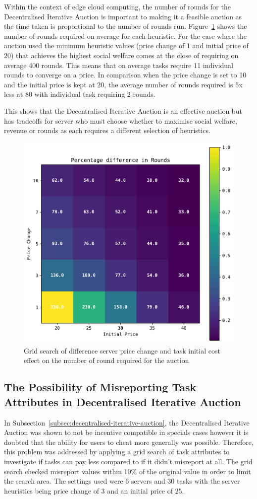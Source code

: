 Within the context of edge cloud computing, the number of rounds for the Decentralised Iterative Auction is important
to making it a feasible auction as the time taken is proportional to the number of rounds run.
Figure~\ref{fig:dia-rounds-grid-search} shows the number of rounds required on average for each heuristic. For the case where the
auction used the minimum heuristic values (price change of 1 and initial price of 20) that achieves the highest social
welfare comes at the close of requiring on average 400 rounds. This means that on average tasks require 11
individual rounds to converge on a price. In comparison when the price change is set to 10 and the initial price is
kept at 20, the average number of rounds required is 5x less at 80 with individual task requiring 2 rounds.

This shows that the Decentralised Iterative Auction is an effective auction but has tradeoffs for server who must
choose whether to maximise social welfare, revenue or rounds as each requires a different selection of heuristics.

\begin{figure}[h]
    \centering
    \includegraphics[width=0.45\linewidth]{figs/dia_heuristics/rounds_grid.pdf}
    \caption{Grid search of difference server price change and task initial cost effect on the number of round required for the auction}
    \label{fig:dia-rounds-grid-search}
\end{figure}

\subsection{The Possibility of Misreporting Task Attributes in Decentralised Iterative Auction}
\label{subsec:possibility-of-misreporting-task-attributes-in-decentarlised-iterative-auction}
In Subsection~\ref{subsec:decentralised-iterative-auction}, the Decentralised Iterative Auction was shown to not be
incentive compatible in specials cases however it is doubted that the ability for users to cheat more generally was
possible. Therefore, this problem was addressed by applying a grid search of task attributes to investigate if
tasks can pay less compared to if it didn't misreport at all. The grid search checked misreport values within
10\% of the original value in order to limit the search area. The settings used were 6 servers and 30 tasks
with the server heuristics being price change of 3 and an initial price of 25.

